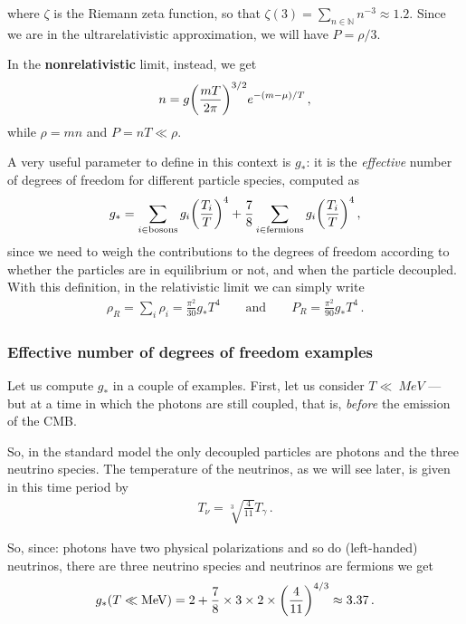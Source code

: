 \documentclass[main.tex]{subfiles}
\begin{document}
where \(\zeta \) is the Riemann zeta function, so that \(\zeta (3) = \sum _{n \in \mathbb{N}} n^{-3} \approx \num{1.2}\). 
Since we are in the ultrarelativistic approximation, we will have \(P  = \rho /3\).

In the \textbf{nonrelativistic} limit, instead, we get 
%
\begin{align}
n = g \qty(\frac{mT}{2 \pi })^{3/2} e^{-(m - \mu ) / T}
\,,
\end{align}
%
while \(\rho = m n\) and \(P = n T \ll \rho \).


A very useful parameter to define in this context is \(g_{*}\): it is the \emph{effective} number of degrees of freedom for different particle species, computed as 
%
\begin{align}
g_{*} = \sum _{i \in \text{bosons}} g_{i} \qty(\frac{T_{i}}{T})^{4} + \frac{7}{8} \sum _{i \in \text{fermions}} g_{i} \qty( \frac{T_i}{T})^{4}
\,,
\end{align}
%
since we need to weigh the contributions to the degrees of freedom according to whether the particles are in equilibrium or not, and when the particle decoupled.
With this definition, in the relativistic limit we can simply write 
%
\begin{align}
\rho_{R} = \sum _{i} \rho_{i} =  \frac{\pi^2}{30 } g_{*} T^{4}
\qquad \text{and} \qquad
P_R = \frac{\pi^2}{90 } g_{*} T^{4}
\,.
\end{align}

\subsubsection{Effective number of degrees of freedom examples}

Let us compute \(g_{*}\) in a couple of examples. First, let us consider \(T \ll \SI{}{MeV}\) --- but at a time in which the photons are still coupled, that is, \emph{before} the emission of the CMB. 

So, in the standard model the only decoupled particles are photons and the three neutrino species.
The temperature of the neutrinos, as we will see later, is given in this time period by 
%
\begin{align}
T_{\nu } = \sqrt[3]{ \frac{4}{11}} T_{\gamma }
\,.
\end{align}

So, since: photons have two physical polarizations and so do (left-handed) neutrinos, there are three neutrino species and neutrinos are fermions we get
%
\begin{align}
g_{*} (T\ll\SI{}{MeV}) = 2 + \frac{7}{8} \times 3 \times 2 \times \qty( \frac{4}{11})^{4/3} \approx 3.37
\,.
\end{align}
\end{document}
